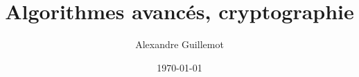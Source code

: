 \documentclass[11pt]{report}
\begin{document}
\title{Algorithmes avancés, cryptographie}
\date{\today}
\author{Alexandre Guillemot}
\maketitle

\tableofcontents

\pagestyle{fancy}
\fancyhf{}
\lhead{\leftmark}
\cfoot{\thepage}


\end{document}
